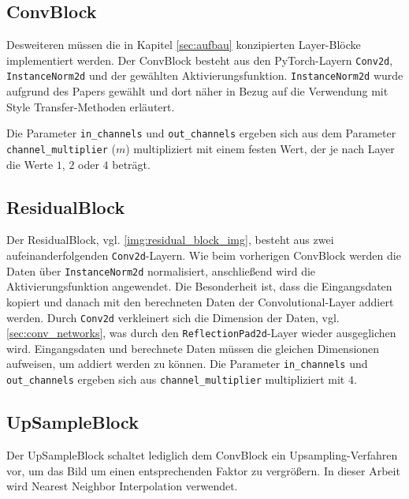 \subsection{ConvBlock}

Desweiteren müssen die in Kapitel \ref{sec:aufbau} konzipierten Layer-Blöcke implementiert werden. Der ConvBlock besteht aus den PyTorch-Layern \texttt{Conv2d}, \texttt{InstanceNorm2d} und der gewählten Aktivierungsfunktion. \texttt{InstanceNorm2d} wurde aufgrund des Papers \cite{DBLP:journals/corr/UlyanovVL16} gewählt und dort näher in Bezug auf die Verwendung mit Style Transfer-Methoden erläutert.

Die Parameter \texttt{in_channels} und \texttt{out_channels} ergeben sich aus dem Parameter \texttt{channel_multiplier} ($ m $) multipliziert mit einem festen Wert, der je nach Layer die Werte $ 1 $, $ 2 $ oder $ 4 $ beträgt.

\subsection{ResidualBlock}

Der ResidualBlock, vgl. \ref{img:residual_block_img}, besteht aus zwei aufeinanderfolgenden \texttt{Conv2d}-Layern. Wie beim vorherigen ConvBlock werden die Daten über \texttt{InstanceNorm2d} normalisiert, anschließend wird die Aktivierungsfunktion angewendet. Die Besonderheit ist, dass die Eingangsdaten kopiert und danach mit den berechneten Daten der Convolutional-Layer addiert werden. Durch \texttt{Conv2d} verkleinert sich die Dimension der Daten, vgl. \ref{sec:conv_networks}, was durch den \texttt{ReflectionPad2d}-Layer wieder ausgeglichen wird. Eingangsdaten und berechnete Daten müssen die gleichen Dimensionen aufweisen, um addiert werden zu können. Die Parameter \texttt{in_channels} und \texttt{out_channels} ergeben sich aus \texttt{channel_multiplier} multipliziert mit $ 4 $.

\subsection{UpSampleBlock}

Der UpSampleBlock schaltet lediglich dem ConvBlock ein Upsampling-Verfahren vor, um das Bild um einen entsprechenden Faktor zu vergrößern. In dieser Arbeit wird Nearest Neighbor Interpolation verwendet.

